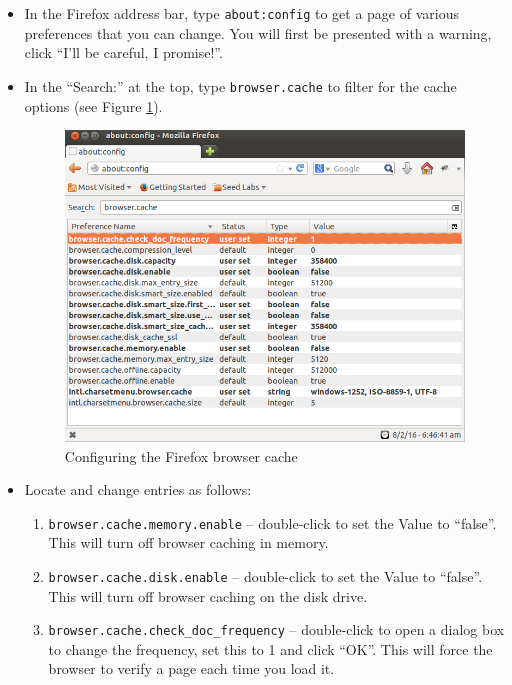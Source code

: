 \documentclass{article}
\begin{document}
\begin{itemize} 
\item In the Firefox address bar, type {\tt about:config} to get a page of various preferences that you can change.  You will first be presented with a warning, click ``I'll be careful, I promise!''.  
\item In the ``Search:''  at the top, type {\tt browser.cache} to filter for the cache options (see Figure \ref{fig:browsercache}).  
\begin{figure}[h]
    \centering
    \includegraphics*[width=.9\textwidth]{figs/Firefox-cache.png}
    \caption{Configuring the Firefox browser cache}
    \label{fig:browsercache}
\end{figure}\item Locate and change entries as follows:

\begin{enumerate}
\item {\tt browser.cache.memory.enable} -- double-click to set the Value to ``false''.  This will turn off browser caching in memory.
\item {\tt browser.cache.disk.enable} -- double-click to set the Value to ``false''.  This will turn off browser caching on the disk drive.
\item {\tt browser.cache.check\_doc\_frequency} -- double-click to open a dialog box to change the frequency, set this to 1 and click ``OK''.  This will force the browser to verify a page each time you load it.  

\end{enumerate}
\end{itemize}
\end{document}

